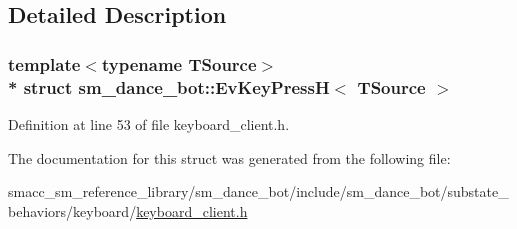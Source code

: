 \subsection{Detailed Description}
\subsubsection*{template$<$typename T\+Source$>$\\*
struct sm\+\_\+dance\+\_\+bot\+::\+Ev\+Key\+Press\+H$<$ T\+Source $>$}



Definition at line 53 of file keyboard\+\_\+client.\+h.



The documentation for this struct was generated from the following file\+:\begin{DoxyCompactItemize}
\item 
smacc\+\_\+sm\+\_\+reference\+\_\+library/sm\+\_\+dance\+\_\+bot/include/sm\+\_\+dance\+\_\+bot/substate\+\_\+behaviors/keyboard/\hyperlink{keyboard__client_8h}{keyboard\+\_\+client.\+h}\end{DoxyCompactItemize}
